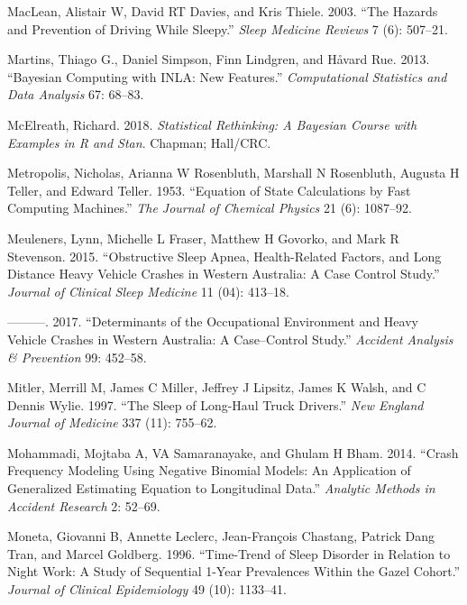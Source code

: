 \documentclass[12pt]{book}
\numberwithin{equation}{chapter}
\begin{document}
\leavevmode\hypertarget{ref-maclean2003hazards}{}%
MacLean, Alistair W, David RT Davies, and Kris Thiele. 2003. ``The Hazards and Prevention of Driving While Sleepy.'' \emph{Sleep Medicine Reviews} 7 (6): 507--21.

\leavevmode\hypertarget{ref-Thiago2013}{}%
Martins, Thiago G., Daniel Simpson, Finn Lindgren, and Håvard Rue. 2013. ``Bayesian Computing with INLA: New Features.'' \emph{Computational Statistics and Data Analysis} 67: 68--83.

\leavevmode\hypertarget{ref-mcelreath2018statistical}{}%
McElreath, Richard. 2018. \emph{Statistical Rethinking: A Bayesian Course with Examples in R and Stan}. Chapman; Hall/CRC.

\leavevmode\hypertarget{ref-metropolis1953equation}{}%
Metropolis, Nicholas, Arianna W Rosenbluth, Marshall N Rosenbluth, Augusta H Teller, and Edward Teller. 1953. ``Equation of State Calculations by Fast Computing Machines.'' \emph{The Journal of Chemical Physics} 21 (6): 1087--92.

\leavevmode\hypertarget{ref-meuleners2015obstructive}{}%
Meuleners, Lynn, Michelle L Fraser, Matthew H Govorko, and Mark R Stevenson. 2015. ``Obstructive Sleep Apnea, Health-Related Factors, and Long Distance Heavy Vehicle Crashes in Western Australia: A Case Control Study.'' \emph{Journal of Clinical Sleep Medicine} 11 (04): 413--18.

\leavevmode\hypertarget{ref-meuleners2017determinants}{}%
---------. 2017. ``Determinants of the Occupational Environment and Heavy Vehicle Crashes in Western Australia: A Case--Control Study.'' \emph{Accident Analysis \& Prevention} 99: 452--58.

\leavevmode\hypertarget{ref-mitler1997sleep}{}%
Mitler, Merrill M, James C Miller, Jeffrey J Lipsitz, James K Walsh, and C Dennis Wylie. 1997. ``The Sleep of Long-Haul Truck Drivers.'' \emph{New England Journal of Medicine} 337 (11): 755--62.

\leavevmode\hypertarget{ref-mohammadi2014crash}{}%
Mohammadi, Mojtaba A, VA Samaranayake, and Ghulam H Bham. 2014. ``Crash Frequency Modeling Using Negative Binomial Models: An Application of Generalized Estimating Equation to Longitudinal Data.'' \emph{Analytic Methods in Accident Research} 2: 52--69.

\leavevmode\hypertarget{ref-moneta1996time}{}%
Moneta, Giovanni B, Annette Leclerc, Jean-François Chastang, Patrick Dang Tran, and Marcel Goldberg. 1996. ``Time-Trend of Sleep Disorder in Relation to Night Work: A Study of Sequential 1-Year Prevalences Within the Gazel Cohort.'' \emph{Journal of Clinical Epidemiology} 49 (10): 1133--41.
\end{document}
